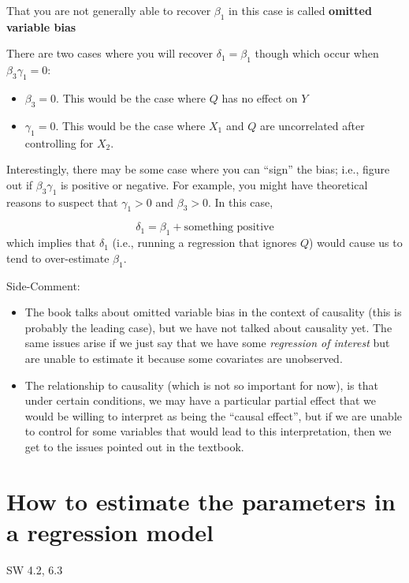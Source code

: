 \documentclass[
  letterpaper,
  DIV=11,
  numbers=noendperiod]{scrreprt}
\begin{document}
That you are not generally able to recover \(\beta_1\) in this case is
called \textbf{omitted variable bias}

There are two cases where you will recover \(\delta_1 = \beta_1\) though
which occur when \(\beta_3 \gamma_1 = 0\):

\begin{itemize}
\item
  \(\beta_3=0\). This would be the case where \(Q\) has no effect on
  \(Y\)
\item
  \(\gamma_1=0\). This would be the case where \(X_1\) and \(Q\) are
  uncorrelated after controlling for \(X_2\).
\end{itemize}

Interestingly, there may be some case where you can ``sign'' the bias;
i.e., figure out if \(\beta_3 \gamma_1\) is positive or negative. For
example, you might have theoretical reasons to suspect that
\(\gamma_1 > 0\) and \(\beta_3 > 0\). In this case,

\[
  \delta_1 = \beta_1 + \textrm{something positive}
\] which implies that \(\delta_1\) (i.e., running a regression that
ignores \(Q\)) would cause us to tend to over-estimate \(\beta_1\).

{Side-Comment:}

\begin{itemize}
\item
  The book talks about omitted variable bias in the context of causality
  (this is probably the leading case), but we have not talked about
  causality yet. The same issues arise if we just say that we have some
  \emph{regression of interest} but are unable to estimate it because
  some covariates are unobserved.
\item
  The relationship to causality (which is not so important for now), is
  that under certain conditions, we may have a particular partial effect
  that we would be willing to interpret as being the ``causal effect'',
  but if we are unable to control for some variables that would lead to
  this interpretation, then we get to the issues pointed out in the
  textbook.
\end{itemize}

\section{How to estimate the parameters in a regression
model}\label{how-to-estimate-the-parameters-in-a-regression-model}

SW 4.2, 6.3
\end{document}
